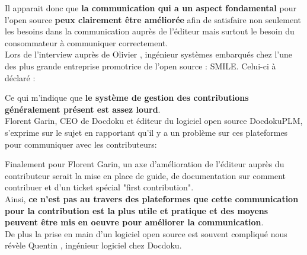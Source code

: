 			Il apparait donc que \textbf{la communication qui a un aspect fondamental} pour l'open source \textbf{peux clairement être améliorée} afin de satisfaire non seulement les besoins dans la communication auprès de l'éditeur mais surtout le besoin du consommateur à communiquer correctement.\\

			Lors de l'interview auprès de Olivier , ingénieur systèmes embarqués chez l'une des plus grande entreprise promotrice de l'open source : SMILE. Celui-ci à déclaré : 

			\begin{center}
				\textit{
				}
			\end{center}

			Ce qui m'indique que \textbf{le système de gestion des contributions généralement présent est assez lourd}.\\

			Florent Garin, CEO de Docdoku et éditeur du logiciel open source DocdokuPLM, s'exprime sur le sujet en rapportant qu'il y a un problème sur ces plateformes pour communiquer avec les contributeurs:

			\begin{center}
				\textit{
				}
			\end{center}

			Finalement pour Florent Garin, un axe d'amélioration de l'éditeur auprès du contributeur serait la mise en place de guide, de documentation sur comment contribuer et d'un ticket spécial "first contribution".\\

			Ainsi, \textbf{ce n'est pas au travers des plateformes que cette communication pour la contribution est la plus utile et pratique et des moyens peuvent être mis en oeuvre pour améliorer la communication}.\\

			De plus la prise en main d'un logiciel open source est souvent compliqué nous révèle Quentin , ingénieur logiciel chez Docdoku.\\


